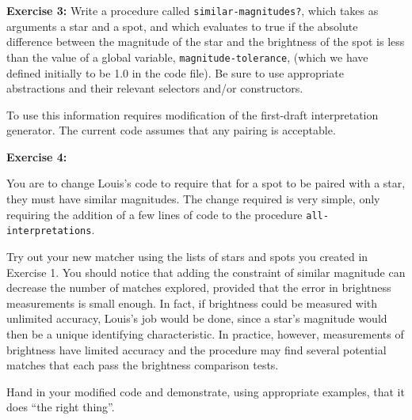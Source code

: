 {\bf Exercise 3:} Write a procedure called {\tt similar-magnitudes?},
which takes as arguments a star and a spot, and which evaluates to
true if the absolute difference between the magnitude of the star and
the brightness of the spot is less than the value of a global
variable, {\tt magnitude-tolerance}, (which we have defined initially
to be 1.0 in the code file).  Be sure to use appropriate abstractions
and their relevant selectors and/or constructors.

%

\null

To use this information requires modification of the first-draft
interpretation generator.  The current code assumes that any pairing
is acceptable.  

{\bf Exercise 4:}

You are to change Louis's code to require that for a spot to be paired
with a star, they must have similar magnitudes.  The change required
is very simple, only requiring the addition of a few lines of code to the
procedure {\tt all-interpretations}.  

Try out your new matcher using the lists of stars and spots you
created in Exercise 1.  You should notice that adding the constraint
of similar magnitude can decrease the number of matches explored,
provided that the error in brightness measurements is small enough.
In fact, if brightness could be measured with unlimited accuracy,
Louis's job would be done, since a star's magnitude would then be a
unique identifying characteristic.  In practice, however, measurements
of brightness have limited accuracy and the procedure may find several
potential matches that each pass the brightness comparison tests.

Hand in your modified code and demonstrate, using appropriate
examples, that it does ``the right thing''.


